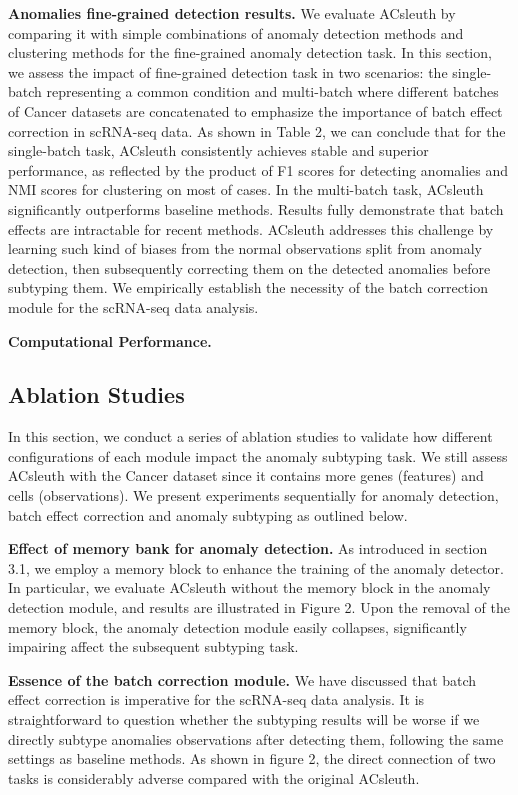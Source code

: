 \documentclass{article}
\begin{document}
\textbf{Anomalies fine-grained detection results.}	We evaluate ACsleuth by comparing it with simple combinations 
of anomaly detection methods and clustering methods for the fine-grained anomaly detection task. In 
this section, we assess the impact of fine-grained detection task in two scenarios: the 
single-batch representing a common condition and multi-batch where different batches of 
Cancer datasets are concatenated to emphasize the importance of batch effect correction 
in scRNA-seq data. As shown in Table 2, we can conclude that for the single-batch task, 
ACsleuth consistently achieves stable and superior performance, as reflected by the product 
of F1 scores for detecting anomalies and NMI scores for clustering on most of cases. In 
the multi-batch task, ACsleuth significantly outperforms baseline methods. Results fully 
demonstrate that batch effects are intractable for recent methods. ACsleuth addresses this 
challenge by learning such kind of biases from the normal observations split from anomaly 
detection, then subsequently correcting them on the detected anomalies before subtyping 
them. We empirically establish the necessity of the batch correction module for the scRNA-seq data analysis.

\textbf{Computational Performance.}
\subsection{Ablation Studies}
In this section, we conduct a series of ablation studies to validate how different 
configurations of each module impact the anomaly subtyping task. We still assess ACsleuth with 
the Cancer dataset since it contains more genes (features) and cells (observations). We 
present experiments sequentially for anomaly detection, batch effect correction and anomaly 
subtyping as outlined below.

\textbf{Effect of memory bank for anomaly detection.}	As introduced in section 3.1, 
we employ a memory block to enhance the training of the anomaly detector. In particular, 
we evaluate ACsleuth without the memory block in the anomaly detection module, and results are 
illustrated in Figure 2. Upon the removal of the memory block, the anomaly detection 
module easily collapses, significantly impairing affect the subsequent subtyping task.

\textbf{Essence of the batch correction module.}	We have discussed that batch effect correction 
is imperative for the scRNA-seq data analysis. It is straightforward to question whether 
the subtyping results will be worse if we directly subtype anomalies observations after 
detecting them, following the same settings as baseline methods. As shown in figure 2, 
the direct connection of two tasks is considerably adverse compared with the original ACsleuth.
\end{document}
